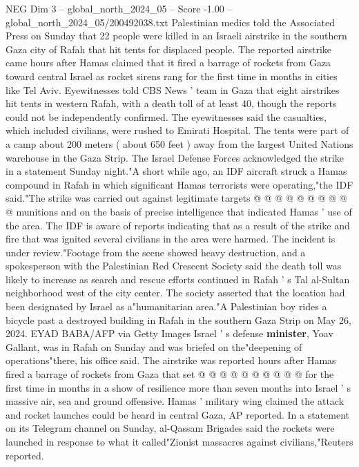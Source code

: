 \begin{textsample}{NEG Dim 3 – global\_north\_2024\_05 – Score -1.00 – global\_north\_2024\_05/200492038.txt}  \label{ex:f3_neg_443}
Palestinian medics told the Associated Press on Sunday that 22 people were killed in an Israeli airstrike in the southern Gaza city of Rafah that hit tents for displaced people.
The reported airstrike came hours after Hamas claimed that it fired a barrage of rockets from Gaza toward central Israel as rocket sirens rang for the first time in months in cities like Tel Aviv.
Eyewitnesses told CBS News ' team in Gaza that eight airstrikes hit tents in western Rafah, with a death toll of at least 40, though the reports could not be independently confirmed.
The eyewitnesses said the casualties, which included civilians, were rushed to Emirati Hospital.
The tents were part of a camp about 200 meters ( about 650 feet ) away from the largest United Nations warehouse in the Gaza Strip.
The Israel Defense Forces acknowledged the strike in a statement Sunday night."A short while ago, an IDF aircraft struck a Hamas compound in Rafah in which significant Hamas terrorists were operating,"the IDF said."The strike was carried out against legitimate targets @ @ @ @ @ @ @ @ @ @ munitions and on the basis of precise intelligence that indicated Hamas ' use of the area.
The IDF is aware of reports indicating that as a result of the strike and fire that was ignited several civilians in the area were harmed.
The incident is under review."Footage from the scene showed heavy destruction, and a spokesperson with the Palestinian Red Crescent Society said the death toll was likely to increase as search and rescue efforts continued in Rafah ' s Tal al-Sultan neighborhood west of the city center.
The society asserted that the location had been designated by Israel as a"humanitarian area."A Palestinian boy rides a bicycle past a destroyed building in Rafah in the southern Gaza Strip on May 26, 2024.
EYAD BABA/AFP via Getty Images Israel ' s defense \textbf{minister}, Yoav Gallant, was in Rafah on Sunday and was briefed on the"deepening of operations"there, his office said.
The airstrike was reported hours after Hamas fired a barrage of rockets from Gaza that set @ @ @ @ @ @ @ @ @ @ for the first time in months in a show of resilience more than seven months into Israel ' s massive air, sea and ground offensive.
Hamas ' military wing claimed the attack and rocket launches could be heard in central Gaza, AP reported.
In a statement on its Telegram channel on Sunday, al-Qassam Brigades said the rockets were launched in response to what it called"Zionist massacres against civilians,"Reuters reported.

\end{textsample}
